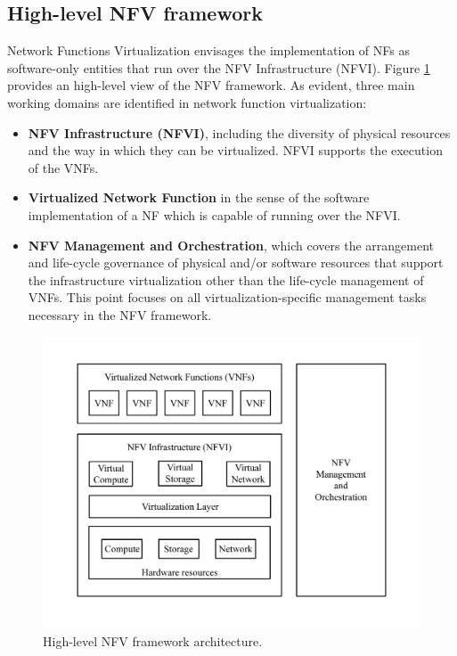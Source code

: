 \subsection{High-level NFV framework}
Network Functions Virtualization envisages the implementation of NFs as software-only entities that run over the NFV Infrastructure (NFVI). Figure \ref{fig:etsi_hl_nfv_framework} provides an high-level view of the NFV framework. As evident, three main working domains are identified in network function virtualization:
\begin{itemize}
	\item \textbf{NFV Infrastructure (NFVI)}, including the diversity of physical resources and the way in which they can be virtualized. NFVI supports the execution of the VNFs.
	\item \textbf{Virtualized Network Function} in the sense of the software implementation of a NF which is capable of running over the NFVI.
	\item \textbf{NFV Management and Orchestration}, which covers the arrangement and life-cycle governance of physical and/or software resources that support the infrastructure virtualization other than the life-cycle management of VNFs. This point focuses on all virtualization-specific management tasks necessary in the NFV framework.
\end{itemize}
\begin{figure}[h]
	\centering
	\includegraphics[clip= true, width= \columnwidth]{images/ETSI_Architectural_framework.pdf}
	\caption{High-level NFV framework architecture.}
	\label{fig:etsi_hl_nfv_framework}
\end{figure}

